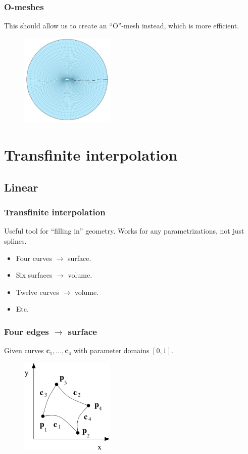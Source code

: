 \documentclass{beamer}
\begin{document}
\begin{frame}
  \frametitle{O-meshes}

  This should allow us to create an ``O''-mesh instead, which is more efficient.

  \begin{figure}
    \centering
    \includegraphics[width=0.4\textwidth]{figs/omesh}
  \end{figure}
\end{frame}

\section{Transfinite interpolation}
\subsection{Linear}

\begin{frame}
  \frametitle{Transfinite interpolation}

  Useful tool for ``filling in'' geometry.  Works for any parametrizations, not just splines.
  
  \begin{itemize}
  \item Four curves $\rightarrow$ surface.
  \item Six surfaces $\rightarrow$ volume.
  \item Twelve curves $\rightarrow$ volume.
  \item Etc.
  \end{itemize}
\end{frame}

\begin{frame}
  \frametitle{Four edges $\rightarrow$ surface}

  Given curves $\mathbf{c}_1, \ldots, \mathbf{c}_4$ with parameter domains $[0,1]$.

  \begin{figure}
    \centering
    \includegraphics[width=0.4\textwidth]{figs/tfi}
  \end{figure}
\end{frame}
\end{document}
